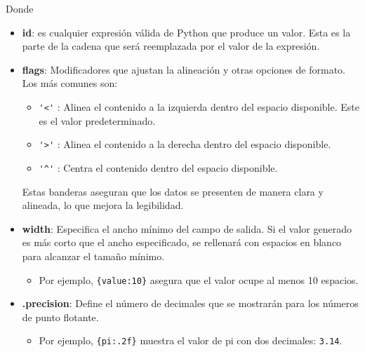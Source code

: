 Donde
\begin{itemize}
\item \textbf{id}: es cualquier expresión válida de Python que produce un valor. Esta es la parte de la cadena que será reemplazada por el valor de la expresión.

\item \textbf{flags}: Modificadores que ajustan la alineación y otras opciones de formato. Los más comunes son:

\begin{itemize}
    \item \verb|'<'| : Alinea el contenido a la izquierda dentro del espacio disponible. Este es el valor predeterminado.
    \item \verb|'>'| : Alinea el contenido a la derecha dentro del espacio disponible.
    \item \verb|'^'| : Centra el contenido dentro del espacio disponible.
\end{itemize}
Estas banderas aseguran que los datos se presenten de manera clara y alineada, lo que mejora la legibilidad.

\item \textbf{width}: Especifica el ancho mínimo del campo de salida. Si el valor generado es más corto que el ancho especificado, se rellenará con espacios en blanco para alcanzar el tamaño mínimo.
\begin{itemize}
    \item Por ejemplo, \verb|{value:10}| asegura que el valor ocupe al menos 10 espacios.
\end{itemize}

\item \textbf{.precision}: Define el número de decimales que se mostrarán para los números de punto flotante.
\begin{itemize}
    \item Por ejemplo, \verb|{pi:.2f}| muestra el valor de pi con dos decimales: \verb|3.14|.
\end{itemize}



\end{itemize}
